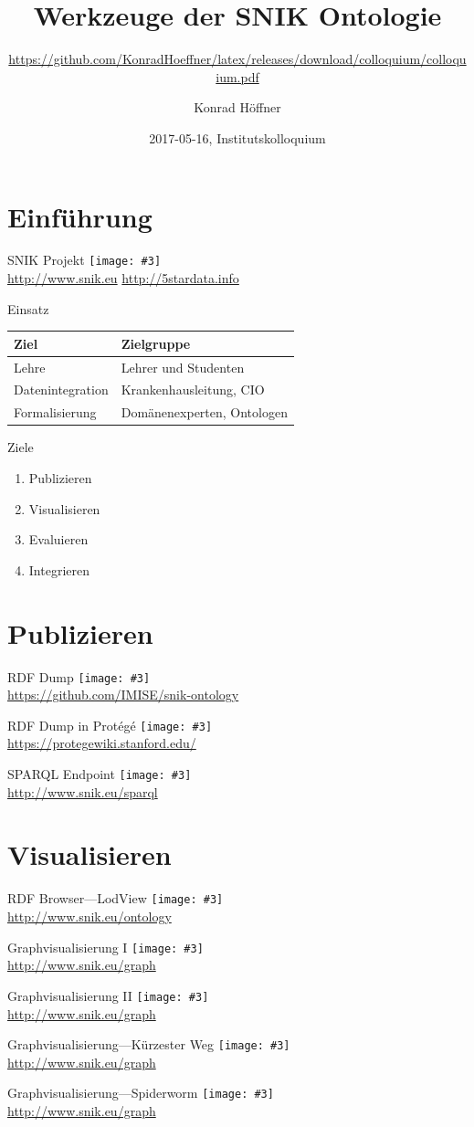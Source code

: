 \documentclass{beamer}
\author{Konrad Höffner}
\date{2017-05-16, Institutskolloquium}
\title{Werkzeuge der SNIK Ontologie}
\subtitle{\url{https://github.com/KonradHoeffner/latex/releases/download/colloquium/colloquium.pdf}}
\newcommand{\imageslide}[3][]
{
\begin{frame}{#2}
\centering\texttt{[image: \#3]}
\\#1
\end{frame}
}
\begin{document}
\begin{frame}
\titlepage
\end{frame}

\section{Einführung}

\imageslide[\url{http://www.snik.eu} \url{http://5stardata.info}]{SNIK Projekt}{img/5star.png}

\begin{frame}{Einsatz}
\centering
\begin{tabular}{ll}
\toprule
\textbf{Ziel}	&\textbf{Zielgruppe}\\
\midrule
Lehre			&Lehrer und Studenten\\ 
Datenintegration	&Krankenhausleitung, CIO\\
Formalisierung		&Domänenexperten, Ontologen\\
\bottomrule
\end{tabular}
\end{frame}

\begin{frame}{Ziele}
\begin{enumerate}
\item Publizieren 
\item Visualisieren 
\item Evaluieren
\item Integrieren 
\end{enumerate}
\end{frame}

\section{Publizieren}

\imageslide[\url{https://github.com/IMISE/snik-ontology}]{RDF Dump}{img/rdfdump.png}
\imageslide[\url{https://protegewiki.stanford.edu/}]{RDF Dump in Protégé}{img/protege.png}
\imageslide[\url{http://www.snik.eu/sparql}]{SPARQL Endpoint}{img/sparqlresult.png}

\section{Visualisieren}

\imageslide[\url{http://www.snik.eu/ontology}]{RDF Browser---LodView}{img/browse-cio.png}

\imageslide[\url{http://www.snik.eu/graph}]{Graphvisualisierung I}{img/graph-entitytype.png}
\imageslide[\url{http://www.snik.eu/graph}]{Graphvisualisierung II}{img/graph-erf.png}
\imageslide[\url{http://www.snik.eu/graph}]{Graphvisualisierung---Kürzester Weg}{img/shortestpath.png}
\imageslide[\url{http://www.snik.eu/graph}]{Graphvisualisierung---Spiderworm}{img/spiderworm.png}
\end{document}
